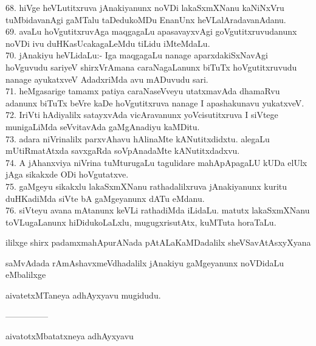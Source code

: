 \documentclass{article}
\begin{document}
68. hiVge heVLutitxruva jAnakiyanunx noVDi lakaSxmXNanu kaNiNxVru tuMbidavanAgi gaMTalu taDedukoMDu EnanUnx heVLalAradavanAdanu.\\
69. avaLu hoVgutitxruvAga maqgagaLu apasavayxvAgi goVgutitxruvudanunx noVDi ivu duHKasUcakagaLeMdu tiLidu iMteMdaLu.\\
70. jAnakiyu heVLidaLu:- Iga maqgagaLu nanage aparxdakiSxNavAgi hoVguvudu sariyeV shirxVrAmana caraNagaLanunx biTuTx hoVgutitxruvudu nanage ayukatxveV AdadxriMda avu mADuvudu sari.\\
71. heMgasarige tamamx patiya caraNaseVveyu utatxmavAda dhamaRvu adanunx biTuTx beVre kaDe hoVgutitxruva nanage I apashakunavu yukatxveV.\\
72. IriVti hAdiyalilx satayxvAda vicAravanunx yoVcisutitxruva I siVtege munigaLiMda seVvitavAda gaMgAnadiyu kaMDitu.\\
73. adara niVrinalilx parxvAhavu hAlinaMte kANutitxdidxtu. alegaLu mUtiRmatAtxda savxgaRda soVpAnadaMte kANutitxdadxvu.\\
74. A jAhanxviya niVrina tuMturugaLu tagulidare mahApApagaLU kUDa elUlx jAga sikakxde ODi hoVgutatxve.\\
75. gaMgeyu sikakxlu lakaSxmXNanu rathadalilxruva jAnakiyanunx kuritu duHKadiMda siVte bA gaMgeyanunx dATu eMdanu.\\
76. siVteyu avana mAtanunx keVLi rathadiMda iLidaLu. matutx lakaSxmXNanu toVLugaLanunx hiDidukoLaLxlu, mugugxrisutAtx, kuMTuta horaTaLu.

\begin{center}
ililxge shirx padamxmahApurANada pAtALaKaMDadalilx sheVSavAtAsxyXyana
\end{center}

\begin{center}
saMvAdada rAmAshavxmeVdhadalilx jAnakiyu gaMgeyanunx noVDidaLu eMbalilxge
\end{center}

\begin{center}
aivatetxMTaneya adhAyxyavu mugidudu.
\end{center}

\begin{center}
---------------
\end{center}

\begin{center}
aivatotxMbatatxneya adhAyxyavu
\end{center}
\end{document}
